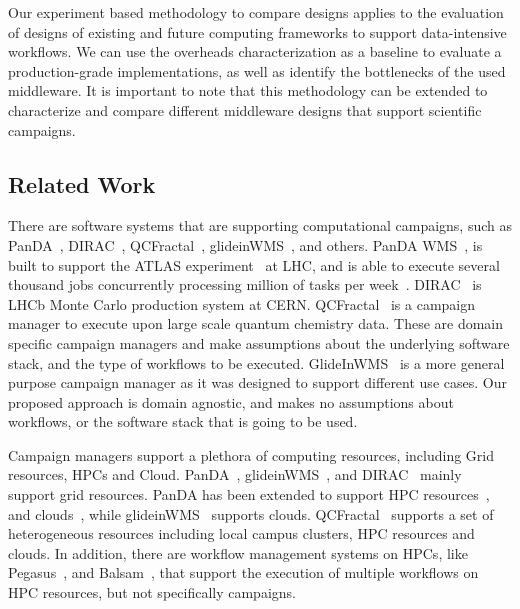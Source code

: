 Our experiment based methodology to compare designs applies to the evaluation of designs of existing and future computing frameworks to support data-intensive workflows.
We can use the overheads characterization as a baseline to evaluate a production-grade implementations, as well as identify the bottlenecks of the used middleware.
It is important to note that this methodology can be extended to characterize and compare different middleware designs that support scientific campaigns.


\subsection{Related Work}

There are software systems that are supporting computational campaigns, such as PanDA~\cite{maeno2008panda}, DIRAC~\cite{casajus2010dirac}, QCFractal~\cite{qcfractal}, glideinWMS~\cite{sfiligoi2008glidein}, and others. 
PanDA WMS~\cite{maeno2008panda}, is built to support the ATLAS experiment~\cite{atlas} at LHC, and is able to execute several thousand jobs concurrently processing million of tasks per week~\cite{de2015future}.
DIRAC~\cite{tsaregorodtsev2003dirac} is LHCb Monte Carlo production system at CERN.
QCFractal~\cite{qcfractal} is a campaign manager to execute upon large scale quantum chemistry data.
These are domain specific campaign managers and make assumptions about the underlying software stack, and the type of workflows to be executed.
GlideInWMS~\cite{sfiligoi2008glidein} is a more general purpose campaign manager as it was designed to support different use cases.
Our proposed approach is domain agnostic, and makes no assumptions about workflows, or the software stack that is going to be used.

Campaign managers support a plethora of computing resources, including Grid resources, HPCs and Cloud.
PanDA~\cite{maeno2008panda}, glideinWMS~\cite{sfiligoi2008glidein}, and DIRAC~\cite{casajus2010dirac} mainly support grid resources.
PanDA has been extended to support HPC resources~\cite{de2015future, de2016accelerating}, and clouds~\cite{de2016accelerating}, while glideinWMS~\cite{sfiligoi2008glidein} supports clouds.
QCFractal~\cite{qcfractal} supports a set of heterogeneous resources including local campus clusters, HPC resources and clouds.
In addition, there are workflow management systems on HPCs, like Pegasus~\cite{deelman2015pegasus}, and Balsam~\cite{salim2019balsam}, that support the execution of multiple workflows on HPC resources, but not specifically campaigns.

